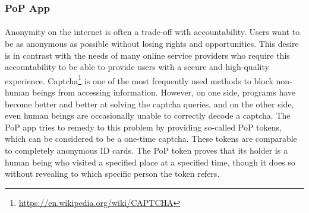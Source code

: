 \subsubsection*{PoP App\raisebox{.3\baselineskip}{\normalsize\footnotemark}}

\paragraph{}
Anonymity on the internet is often a trade-off with accountability. Users want to be as anonymous as possible without losing rights and opportunities. This desire is in contrast with the needs of many online service providers who require this accountability to be able to provide users with a secure and high-quality experience. Captcha\footnote{\url{https://en.wikipedia.org/wiki/CAPTCHA}} is one of the most frequently used methods to block non-human beings from accessing information. However, on one side, programs have become better and better at solving the captcha queries, and on the other side, even human beings are occasionally unable to correctly decode a captcha. The PoP app tries to remedy to this problem by providing so-called PoP tokens, which can be considered to be a one-time captcha. These tokens are comparable to completely anonymous ID cards. The PoP token proves that its holder is a human being who visited a specified place at a specified time, though it does so without revealing to which specific person the token refers.
